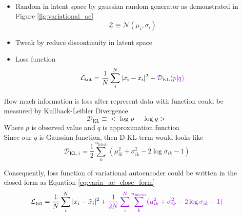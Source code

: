 \begin{itemize}
    \item Random  in latent space by gaussian random generator as demonstrated in Figure \ref{fig:variational_ae}
    \begin{equation}
        \mathcal{Z} \equiv \mathcal{N}(\mu_i, \sigma_i)
    \end{equation}
    \item Tweak by \textcolor[RGB]{148,0,211}{reduce discontinuity in latent space}
    \item Loss function
    \begin{equation}
        \mathcal{L}_{\text{tot}} = \frac{1}{N}\sum_i^N |x_i-\tilde{x}_i|^2 + \textcolor[RGB]{148,0,211}{\mathcal{D}_{\text{KL}}(p|q)}
    \end{equation}
\end{itemize}


\begin{theorem}
    How much information is loss after represent data with function could be measured by Kullback-Leibler Divergence
    \begin{equation}
        \mathcal{D}_{\text{KL}} \equiv < \log p - \log q >
    \end{equation}
    Where $p$ is observed value and $q$ is approximation function \\
    Since our $q$ is Gaussian function, then D-KL term would looks like
    \begin{equation}
        \mathcal{D}_{\text{KL}, i} = \frac{1}{2}\sum_k^{n_{\text{latent}}}(\mu_{ik}^2 +\sigma_{ik}^2 - 2\log\sigma_{ik} - 1)
    \end{equation}
\end{theorem}

Consequently, loss function of variational autoencoder could be written in the closed form as Equation \ref{eq:varia_ae_close_form}
\begin{equation}\label{eq:varia_ae_close_form}
    \mathcal{L}_{\text{tot}} = \frac{1}{N}\sum_i^N |x_i-\tilde{x}_i|^2 + \textcolor[RGB]{148,0,211}{\frac{1}{2N}\sum_i^N\sum_k^{n_{\text{latent}}}(\mu_{ik}^2 +\sigma_{ik}^2 - 2\log\sigma_{ik} - 1)}
\end{equation}